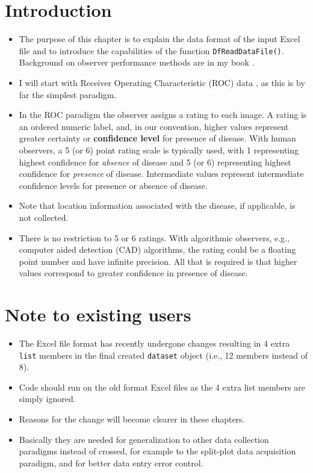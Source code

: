 \documentclass[
]{book}
\providecommand{\tightlist}{%
  \setlength{\itemsep}{0pt}\setlength{\parskip}{0pt}}
\begin{document}
\hypertarget{rocdataformatIntro}{%
\section{Introduction}\label{rocdataformatIntro}}

\begin{itemize}
\tightlist
\item
  The purpose of this chapter is to explain the data format of the input Excel file and to introduce the capabilities of the function \texttt{DfReadDataFile()}. Background on observer performance methods are in my book \citep{RN2680}.
\item
  I will start with Receiver Operating Characteristic (ROC) data \citep{RN1766}, as this is by far the simplest paradigm.
\item
  In the ROC paradigm the observer assigns a rating to each image. A rating is an ordered numeric label, and, in our convention, higher values represent greater certainty or \textbf{confidence level} for presence of disease. With human observers, a 5 (or 6) point rating scale is typically used, with 1 representing highest confidence for \emph{absence} of disease and 5 (or 6) representing highest confidence for \emph{presence} of disease. Intermediate values represent intermediate confidence levels for presence or absence of disease.
\item
  Note that location information associated with the disease, if applicable, is not collected.
\item
  There is no restriction to 5 or 6 ratings. With algorithmic observers, e.g., computer aided detection (CAD) algorithms, the rating could be a floating point number and have infinite precision. All that is required is that higher values correspond to greater confidence in presence of disease.
\end{itemize}

\hypertarget{note-to-existing-users}{%
\section{Note to existing users}\label{note-to-existing-users}}

\begin{itemize}
\tightlist
\item
  The Excel file format has recently undergone changes resulting in 4 extra \texttt{list} members in the final created \texttt{dataset} object (i.e., 12 members instead of 8).
\item
  Code should run on the old format Excel files as the 4 extra list members are simply ignored.
\item
  Reasons for the change will become clearer in these chapters.
\item
  Basically they are needed for generalization to other data collection paradigms instead of crossed, for example to the split-plot data acquisition paradigm, and for better data entry error control.
\end{itemize}
\end{document}
